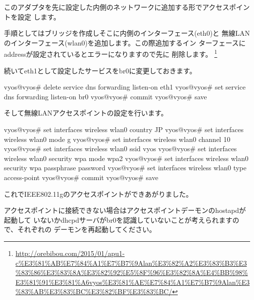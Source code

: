 \documentclass[mingoth,a4paper]{jsarticle}
\begin{document}
このアダプタを先に設定した内側のネットワークに追加する形でアクセスポイントを設定
します。

手順としてはブリッジを作成しそこに内側のインターフェース(eth0)と
無線LANのインターフェース(wlan0)を追加します。この際追加するイン
ターフェースにaddressが設定されているとエラーになりますので先に
削除します。
\footnote{\url{http://orebibou.com/2015/01/apu1-c\%E3\%81\%AB\%E7\%84\%A1\%E7\%B7\%9Alan\%E3\%82\%A2\%E3\%83\%B3\%E3\%83\%86\%E3\%83\%8A\%E3\%82\%92\%E5\%8F\%96\%E3\%82\%8A\%E4\%BB\%98\%E3\%81\%91\%E3\%81\%A6vyos\%E3\%81\%AE\%E7\%84\%A1\%E7\%B7\%9Alan\%E3\%83\%AB\%E3\%83\%BC\%E3\%82\%BF\%E3\%83\%BC/}}


続いてeth1として設定したサービスをbr0に変更しておきます。

\begin{commandline}
vyos@vyos# delete service dns forwarding listen-on eth1
vyos@vyos# set service dns forwarding listen-on br0
vyos@vyos# commit
vyos@vyos# save
\end{commandline}

そして無線LANアクセスポイントの設定を行います。

\begin{commandline}
vyos@vyos# set interfaces wireless wlan0 country JP
vyos@vyos# set interfaces wireless wlan0 mode g
vyos@vyos# set interfaces wireless wlan0 channel 10
vyos@vyos# set interfaces wireless wlan0 ssid vyos
vyos@vyos# set interfaces wireless wlan0 security wpa mode wpa2
vyos@vyos# set interfaces wireless wlan0 security wpa passphrase password
vyos@vyos# set interfaces wireless wlan0 type access-point
vyos@vyos# commit
vyos@vyos# save
\end{commandline}

これでIEEE802.11gのアクセスポイントができあがりました。

アクセスポイントに接続できない場合はアクセスポイントデーモンのhostapdが起動して
いないかdhcpdサーバがbr0を認識していないことが考えられますので、それぞれの
デーモンを再起動してください。
\end{document}
